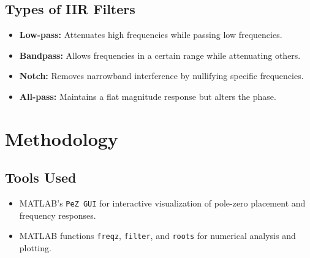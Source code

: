 \documentclass[12pt]{article}
\begin{document}
	\subsection*{Types of IIR Filters}
	\begin{itemize}
		\item \textbf{Low-pass:} Attenuates high frequencies while passing low frequencies.
		\item \textbf{Bandpass:} Allows frequencies in a certain range while attenuating others.
		\item \textbf{Notch:} Removes narrowband interference by nullifying specific frequencies.
		\item \textbf{All-pass:} Maintains a flat magnitude response but alters the phase.
	\end{itemize}
	
	\section*{Methodology}
	\subsection*{Tools Used}
	\begin{itemize}
		\item MATLAB’s \texttt{PeZ GUI} for interactive visualization of pole-zero placement and frequency responses.
		\item MATLAB functions \texttt{freqz}, \texttt{filter}, and \texttt{roots} for numerical analysis and plotting.
	\end{itemize}
	
\end{document}
